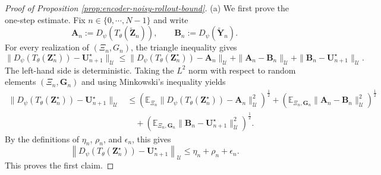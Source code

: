 \documentclass[11pt]{article}
\begin{document}
\iffalse
\begin{proof}[Proof of Proposition \ref{prop:encoder-noisy-rollout-bound}]
(a) We first prove the one-step estimate. Fix $n\in\{0,\cdots,N-1\}$ and write
\[
\mathbf A_n := D_\psi(T_\theta(\widetilde{\mathbf Z}_n)),
\qquad
\mathbf B_n := D_\psi(\widetilde{\mathbf Y}_n).
\]
For every realization of $(\Xi_n,G_n)$, the triangle inequality gives
\[
\|D_\psi\left(T_\theta(\mathbf Z_n^\star)\right)-\mathbf U^\star_{n+1}\|_{\mathcal U}
\le
\|D_\psi\left(T_\theta(\mathbf Z_n^\star)\right)-\mathbf A_n\|_{\mathcal U}
+
\|\mathbf A_n-\mathbf B_n\|_{\mathcal U}
+
\|\mathbf B_n-\mathbf U^\star_{n+1}\|_{\mathcal U}.
\]
The left-hand side is deterministic. Taking the $L^2$ norm with respect to random elements $(\Xi_n,\mathbf G_n)$ and using Minkowski's inequality yields
\begin{equation*}
\begin{aligned}
\|D_\psi\left(T_\theta(\mathbf Z_n^\star)\right)-\mathbf U^\star_{n+1}\|_{\mathcal U}
&\le\left(\mathbb E_{\Xi_n}\|D_\psi\left(T_\theta(\mathbf Z_n^\star)\right)-\mathbf A_n\|_{\mathcal U}^2\right)^{\frac12}+\left(\mathbb E_{\Xi_n,\mathbf G_n}\|\mathbf A_n-\mathbf B_n\|_{\mathcal U}^2\right)^{\frac12}\\
&\quad +\left(\mathbb E_{\Xi_n,\mathbf G_n}\|\mathbf B_n-\mathbf U^\star_{n+1}\|_{\mathcal U}^2\right)^{\frac12}.
\end{aligned}
\end{equation*}
By the definitions of $\eta_n$, $\rho_n$, and $\epsilon_n$, this gives
\[
\left\|D_\psi(T_\theta(\mathbf Z_n^\star))-\mathbf U^\star_{n+1}\right\|_{\mathcal U}\le\eta_n+\rho_n+\epsilon_n .
\]
This proves the first claim.


\end{proof}
\end{document}
